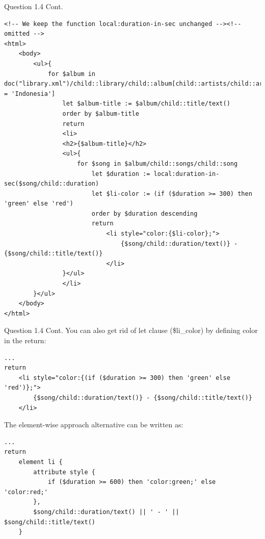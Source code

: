 \begin{frame}[fragile]{Question 1.4 Cont.}
\vspace{-5pt}
\begin{lstlisting}[style=xml-small]
<!-- We keep the function local:duration-in-sec unchanged --><!-- omitted -->
<html>
	<body>
		<ul>{
			for $album in doc("library.xml")/child::library/child::album[child::artists/child::artist/child::country = 'Indonesia']
				let $album-title := $album/child::title/text()
				order by $album-title
				return
				<li>
				<h2>{$album-title}</h2>
				<ul>{
					for $song in $album/child::songs/child::song
						let $duration := local:duration-in-sec($song/child::duration)
						let $li-color := (if ($duration >= 300) then 'green' else 'red')
						order by $duration descending
						return
							<li style="color:{$li-color};">
								{$song/child::duration/text()} - {$song/child::title/text()}
							</li>
				}</ul>
				</li>
		}</ul>
	</body>
</html>
\end{lstlisting}\vspace{5pt}
\end{frame}

\begin{frame}[fragile]{Question 1.4 Cont.}
You can also get rid of let clause (\$li\_color) by defining color in the return:\\
\begin{lstlisting}[style=xml-small-nomargin]
...
return
	<li style="color:{(if ($duration >= 300) then 'green' else 'red')};"> 
		{$song/child::duration/text()} - {$song/child::title/text()}
	</li>
\end{lstlisting}
	
The element-wise approach alternative can be written as:\\
\begin{lstlisting}[style=xml-small-nomargin]
...
return
	element li {
		attribute style {
			if ($duration >= 600) then 'color:green;' else 'color:red;'
		},
		$song/child::duration/text() || ' - ' || $song/child::title/text()
	}
\end{lstlisting}
	
\end{frame}
	
